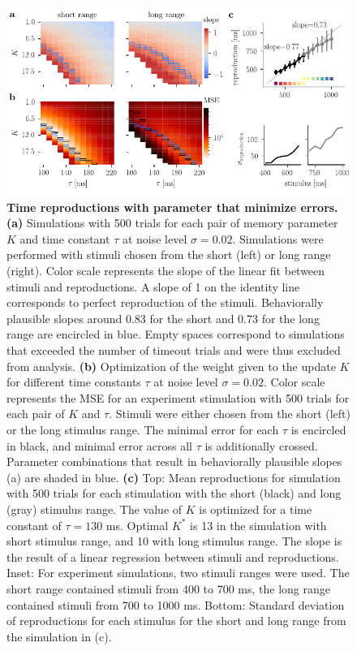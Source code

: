 \documentclass[10pt, a4paper]{article}
\begin{document}
\begin{figure}[ht]
	\centering
	\includegraphics{figures/interIparams.pdf}
	\caption{\textbf{Time reproductions with parameter that minimize errors.} 
	\textbf{(a)} Simulations with 500 trials for each pair of memory parameter $K$ and time constant $\tau$ at noise level $\sigma = 0.02$. Simulations were performed with stimuli chosen from the short (left) or long range (right). Color scale represents the slope of the linear fit between stimuli and reproductions. A slope of 1 on the identity line corresponds to perfect reproduction of the stimuli. Behaviorally plausible slopes around 0.83 for the short and 0.73 for the long range are encircled in blue. Empty spaces correspond to simulations that exceeded the number of timeout trials and were thus excluded from analysis.
	\textbf{(b)} Optimization of the weight given to the update $K$ for different time constants $\tau$ at noise level $\sigma = 0.02$. Color scale represents the MSE for an experiment stimulation with 500 trials for each pair of $K$ and $\tau$. Stimuli were either chosen from the short (left) or the long stimulus range. The minimal error for each $\tau$ is encircled in black, and minimal error across all $\tau$ is additionally crossed. Parameter combinations that result in behaviorally plausible slopes (a) are shaded in blue.
	\textbf{(c)} Top: Mean reproductions for simulation with 500 trials for each stimulation with the short (black) and long (gray) stimulus range. The value of $K$ is optimized for a time constant of $\tau = 130$ ms. 
		Optimal $K^*$ is 13 in the simulation with short stimulus range, and 10 with long stimulus range.
		The slope is the result of a linear regression between stimuli and reproductions.
		Inset: For experiment simulations, two stimuli ranges were used. The short range contained stimuli from 400 to 700 ms, the long range contained stimuli from 700 to 1000 ms.
		Bottom: Standard deviation of reproductions for each stimulus for the short and long range from the simulation in (c).
	}
\label{fig:parameter}
\end{figure}
\end{document}
